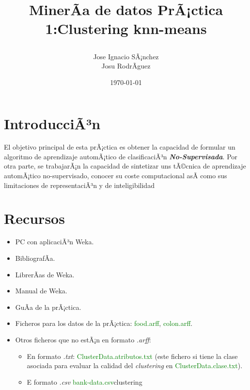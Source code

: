 \documentclass[10pt,a4paper]{article}
\author{Jose Ignacio SÃ¡nchez\\Josu RodrÃ­guez}
\title{\begin{center}\textbf{\Huge{MinerÃ­a de datos} PrÃ¡ctica 1:Clustering knn-means}
\end{center}}
\date{\today}
\newtheorem{defi}{(\it DefiniciÃ³n)}[section]%
\begin{document}
\maketitle

\thispagestyle{empty}%

\newpage

\renewcommand\contentsname{\centering Ã�NDICE DE CONTENIDO}
\tableofcontents%
\thispagestyle{empty}
\newpage

\renewcommand{\listtablename}{\centering Ã�NDICE DE TABLAS} %
\listoftables
\thispagestyle{empty}
\newpage

\renewcommand\listfigurename{\centering Ã�NDICE DE FIGURAS}
\thispagestyle{empty}
\listoffigures
\clearpage

\setcounter{page}{1}%

\section{IntroducciÃ³n}

El objetivo principal de esta prÃ¡ctica es obtener la capacidad de formular un
algoritmo de aprendizaje automÃ¡tico de clasificaciÃ³n \textbf{\textit{No-Supervisada}}. 
Por otra parte, se trabajarÃ¡n la capacidad de sintetizar uns tÃ©cnica de aprendizaje automÃ¡tico
no-supervisado, conocer su coste computacional asÃ­ como sus limitaciones de representaciÃ³n
y de inteligibilidad \par


\section{Recursos}
\begin{itemize}
	\item PC con aplicaciÃ³n Weka.
	\item BibliografÃ­a.
	\item LibrerÃ­as de  Weka.
	\item Manual de Weka.
	\item GuÃ­a de la prÃ¡ctica.
	\item Ficheros para los datos de la
	prÃ¡ctica:
	\textcolor{green}{food.arff},
	\textcolor{green}{colon.arff}.
	\item Otros ficheros que no estÃ¡n en formato \textit{.arff}:
		\begin{itemize}
			\item En formato \textit{.txt}: \textcolor{green}{ClusterData.atributos.txt} (este fichero si tiene la clase asociada para 
			evaluar la calidad del \textit{clustering} en \textcolor{green}{ClusterData.clase.txt}).
			\item E formato \textit{.csv} \textcolor{green}{bank-data.csv}clustering
		\end{itemize}
\end{itemize}
\end{document}
